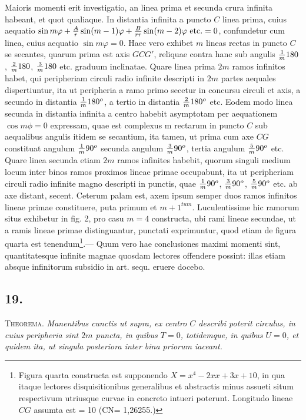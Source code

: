 \documentclass[twoside,12pt, showframe]{memoir}
\let\oldfrac\frac
\def\frac#1#2{\mathchoice{\tfrac{#1}{#2}}{\oldfrac{#1}{#2}}{\genfrac{}{}{}{2}{#1}{#2\mathstrut}}{\genfrac{}{}{}{3}{#1}{#2\mathstrut}}}
\begin{document}
Maioris momenti erit investigatio, an linea prima et secunda crura infinita habeant, et quot qualiaque. In distantia infinita a puncto \(C\) linea prima, cuius aequatio \(\sin m \varphi + \frac{A}{r} \sin (m-1)\varphi + \frac{B}{rr} \sin (m-2) \varphi \text{ etc{.}} = 0\), confundetur cum linea, cuius aequatio \(\sin m \varphi = 0\). Haec vero exhibet \(m\) lineas rectas in puncto \(C\) se secantes, quarum prima est axis \(GCG'\), reliquae contra hanc sub angulis \(\frac{1}{m} 180\), \(\frac{2}{m} 180\), \(\frac{3}{m} 180 \) etc{.} graduum inclinatae.  Quare linea prima \(2m\) ramos infinitos habet, qui peripheriam circuli radio infinite descripti in \(2m\) partes aequales dispertiuntur, ita ut peripheria a ramo primo secetur in concursu circuli et axis, a secundo in distantia \(\frac{1}{m} 180^o\), a tertio in distantia \(\frac{2}{m} 180^o\) etc{.}  Eodem modo linea secunda in distantia infinita a centro habebit asymptotam per aequationem \(\cos m \phi = 0\) expressam, quae est complexus m rectarum in puncto \(C\) sub aequalibus angulis itidem se secantium, ita tamen, ut prima cum axe \(CG\) constituat angulum \(\frac{1}{m}90^o\) secunda angulum \(\frac{3}{m}90^o\), tertia angulum \(\frac{5}{m}90^o\) etc{.} Quare linea secunda etiam \(2m\) ramos infinites habebit, quorum singuli medium locum inter binos ramos proximos lineae primae occupabunt, ita ut peripheriam circuli radio infinite magno descripti in punctis, quae \(\frac{1}{m}90^o\), \(\frac{3}{m}90^o\), \(\frac{5}{m}90^o\) etc{.} ab axe distant, secent. Ceterum palam est, axem ipsum semper duos ramos infinitos lineae primae constituere, puta primum et \({m+1}^{tum}\). Luculentissime hic ramorum situs exhibetur in fig. 2, pro casu \(m = 4\) constructa, ubi rami lineae secundae, ut a ramis lineae primae distinguantur, punctati exprimuntur, quod etiam de figura quarta est tenendum\footnote{Figura quarta constructa est supponendo \(X = x^4 - 2xx + 3x + 10\), in qua itaque lectores disquisitionibus generalibus et abstractis minus assueti situm respectivum utriusque curvae in concreto intueri poterunt.   Longitudo lineae \(CG\) assumta est  = 10  (CN= 1,26255.)}.—  Quum vero hae conclusiones maximi momenti sint, quantitatesque infinite magnae quosdam lectores offendere possint: illas etiam absque infinitorum subsidio in art. sequ. eruere docebo.

\subsection*{19.}

\textsc{Theorema}.  \textit{Manentibus cunctis ut supra, ex centro \(C\) describi poterit circulus, in cuius peripheria sint \(2m\) puncta, in quibus \(T= 0\), totidemque, in quibus \(U=0\), et quidem ita, ut singula posteriora inter bina priorum iaceant.}
\end{document}
